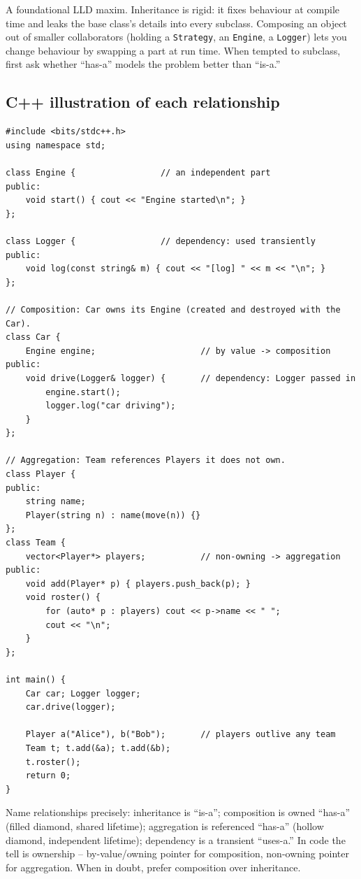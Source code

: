 \begin{ideabox}
A foundational LLD maxim. Inheritance is rigid: it fixes behaviour at
compile time and leaks the base class's details into every subclass. Composing
an object out of smaller collaborators (holding a \texttt{Strategy}, an
\texttt{Engine}, a \texttt{Logger}) lets you change behaviour by swapping a
part at run time. When tempted to subclass, first ask whether ``has-a''
models the problem better than ``is-a.''
\end{ideabox}

\subsection*{C++ illustration of each relationship}

\begin{lstlisting}
#include <bits/stdc++.h>
using namespace std;

class Engine {                 // an independent part
public:
    void start() { cout << "Engine started\n"; }
};

class Logger {                 // dependency: used transiently
public:
    void log(const string& m) { cout << "[log] " << m << "\n"; }
};

// Composition: Car owns its Engine (created and destroyed with the Car).
class Car {
    Engine engine;                     // by value -> composition
public:
    void drive(Logger& logger) {       // dependency: Logger passed in
        engine.start();
        logger.log("car driving");
    }
};

// Aggregation: Team references Players it does not own.
class Player {
public:
    string name;
    Player(string n) : name(move(n)) {}
};
class Team {
    vector<Player*> players;           // non-owning -> aggregation
public:
    void add(Player* p) { players.push_back(p); }
    void roster() {
        for (auto* p : players) cout << p->name << " ";
        cout << "\n";
    }
};

int main() {
    Car car; Logger logger;
    car.drive(logger);

    Player a("Alice"), b("Bob");       // players outlive any team
    Team t; t.add(&a); t.add(&b);
    t.roster();
    return 0;
}
\end{lstlisting}

\begin{takeawaybox}
Name relationships precisely: inheritance is ``is-a''; composition is
owned ``has-a'' (filled diamond, shared lifetime); aggregation is
referenced ``has-a'' (hollow diamond, independent lifetime); dependency is
a transient ``uses-a.'' In code the tell is ownership -- by-value/owning
pointer for composition, non-owning pointer for aggregation. When in
doubt, prefer composition over inheritance.
\end{takeawaybox}
